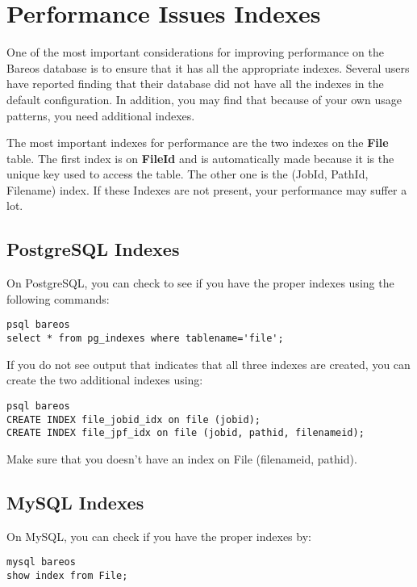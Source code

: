 \section{Performance Issues Indexes}

One of the most important considerations for improving performance on
the Bareos database is to ensure that it has all the appropriate indexes.
Several users have reported finding that their database did not have
all the indexes in the default configuration.  In addition, you may
find that because of your own usage patterns, you need additional indexes.

The most important indexes for performance are the two indexes on the
{\bf File} table.  The first index is on {\bf FileId} and is automatically
made because it is the unique key used to access the table.  The other
one is the (JobId, PathId, Filename) index.  If these Indexes
are not present, your performance may suffer a lot.

\subsection{PostgreSQL Indexes}
On PostgreSQL, you can check to see if you have the proper indexes using
the following commands:

\footnotesize
\begin{verbatim}
psql bareos
select * from pg_indexes where tablename='file';
\end{verbatim}
\normalsize

If you do not see output that indicates that all three indexes
are created, you can create the two additional indexes using:

\footnotesize
\begin{verbatim}
psql bareos
CREATE INDEX file_jobid_idx on file (jobid);
CREATE INDEX file_jpf_idx on file (jobid, pathid, filenameid);
\end{verbatim}
\normalsize

Make sure that you doesn't have an index on File (filenameid, pathid).

\subsection{MySQL Indexes}
On MySQL, you can check if you have the proper indexes by:

\footnotesize
\begin{verbatim}
mysql bareos
show index from File;
\end{verbatim}
\normalsize

